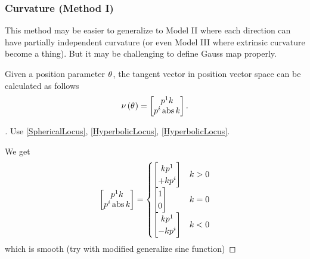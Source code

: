 \documentclass[stu, babel, american, biblatex, a4paper, draftall]{apa7}
\begin{document}
\subsubsection{Curvature (Method I)}
This method may be easier to generalize to
Model II where each direction can have partially independent curvature
(or even Model III where extrinsic curvature become a thing).
But it may be challenging to define Gauss map properly.
\begin{lemma}\label{Model:NormalVector}
    Given a position parameter $\tensor{\theta}{}$,
    the tangent vector in position vector space can be calculated as follows
    \begin{equation*}
        \nu\left(\tensor{\theta}{}\right)
	=
        \begin{bmatrix}
            \tensor{p}{^1}k       \\
            \tensor{p}{^i}\abs{k} \\
        \end{bmatrix}
        \text{.}
    \end{equation*}
\end{lemma}
\begin{proof}[]
    \skipped

    Use \cref{SphericalLocus}, \cref{HyperbolicLocus}, \cref{HyperbolicLocus}.

    We get
    \begin{equation*}
        \begin{bmatrix}
            \tensor{p}{^1}k       \\
            \tensor{p}{^i}\abs{k} \\
        \end{bmatrix}=
        \begin{cases}
            \begin{bmatrix}
                k\tensor{p}{^1}  \\
                +k\tensor{p}{^i} \\
            \end{bmatrix} & k>0 \\
            \begin{bmatrix}
                1 \\
                0 \\
            \end{bmatrix} & k=0 \\
            \begin{bmatrix}
                k\tensor{p}{^1}  \\
                -k\tensor{p}{^i} \\
            \end{bmatrix} & k<0
        \end{cases}
    \end{equation*}
    which is smooth (try with modified generalize sine function)
\end{proof}
\end{document}
